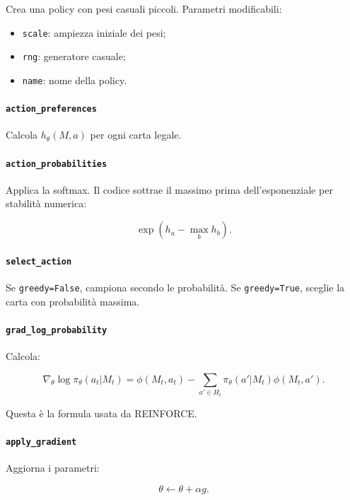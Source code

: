 \documentclass[11pt,a4paper]{article}
\begin{document}
Crea una policy con pesi casuali piccoli. Parametri modificabili:

\begin{itemize}
  \item \texttt{scale}: ampiezza iniziale dei pesi;
  \item \texttt{rng}: generatore casuale;
  \item \texttt{name}: nome della policy.
\end{itemize}

\paragraph{\texttt{action\_preferences}}

Calcola \(h_\theta(M,a)\) per ogni carta legale.

\paragraph{\texttt{action\_probabilities}}

Applica la softmax. Il codice sottrae il massimo prima dell'esponenziale per
stabilità numerica:

\[
\exp(h_a - \max_b h_b).
\]

\paragraph{\texttt{select\_action}}

Se \texttt{greedy=False}, campiona secondo le probabilità. Se
\texttt{greedy=True}, sceglie la carta con probabilità massima.

\paragraph{\texttt{grad\_log\_probability}}

Calcola:

\[
\nabla_\theta \log \pi_\theta(a_t|M_t)
=
\phi(M_t,a_t)
-
\sum_{a'\in H_t}
\pi_\theta(a'|M_t)\phi(M_t,a').
\]

Questa è la formula usata da REINFORCE.

\paragraph{\texttt{apply\_gradient}}

Aggiorna i parametri:

\[
\theta \leftarrow \theta + \alpha g.
\]
\end{document}
